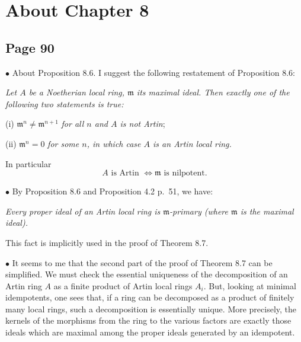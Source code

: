 \documentclass[parskip=half,fontsize=12pt]{scrartcl}%
\newcommand{\mf}{\mathfrak}
\newcommand{\mmm}{\mf m}
\newcommand{\bu}{\bullet}
\begin{document}
\section{About Chapter 8}%

\subsection{Page 90}\label{90}%

$\bu$ About Proposition 8.6. I suggest the following restatement of Proposition 8.6:

\emph{Let $A$ be a Noetherian local ring, $\mmm$ its maximal ideal. Then exactly one of the following two statements is true:}

(i) $\mmm^n\ne\mmm^{n+1}$ \emph{for all $n$ and $A$ is \emph{not} Artin};

(ii) $\mmm^n=0$ \emph{for some $n$, in which case $A$ is an Artin local ring.}

In particular 
\begin{equation}\label{86}
A\text{ is Artin $\iff\mmm$ is nilpotent.}
\end{equation}%

$\bu$ By Proposition 8.6 and Proposition 4.2 p.~51, we have:

\emph{Every proper ideal of an Artin local ring is $\mmm$-primary (where $\mmm$ is the maximal ideal).} 

This fact is implicitly used in the proof of Theorem 8.7.

$\bu$ It seems to me that the second part of the proof of Theorem 8.7 can be simplified. We must check the essential uniqueness of the decomposition of an Artin ring $A$ as a finite product of Artin local rings $A_i$. But, looking at minimal idempotents, one sees that, if a ring can be decomposed as a product of finitely many local rings, such a decomposition is essentially unique. More precisely, the kernels of the morphisms from the ring to the various factors are exactly those ideals which are maximal among the proper ideals generated by an idempotent. %
\end{document}
